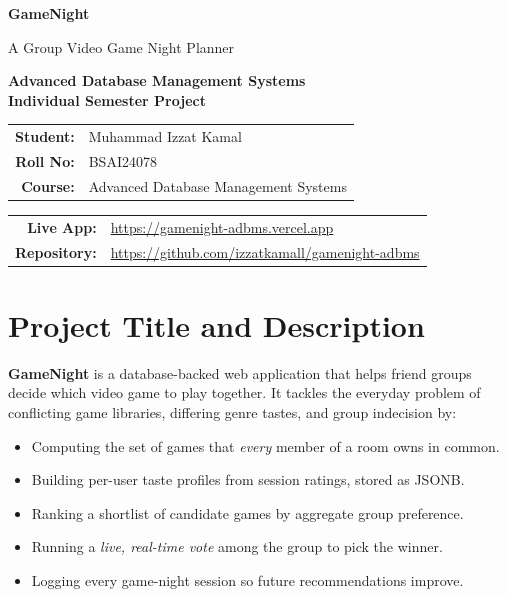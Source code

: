 \documentclass[11pt,a4paper]{article}
\begin{document}
\begin{titlepage}
\centering
\vspace*{2cm}
{\Huge\bfseries\color{accent} GameNight\par}
\vspace{0.4cm}
{\Large A Group Video Game Night Planner\par}
\vspace{1.5cm}
{\large\bfseries Advanced Database Management Systems\\Individual Semester Project\par}
\vspace{2cm}
\begin{tabular}{rl}
\textbf{Student:} & Muhammad Izzat Kamal \\[4pt]
\textbf{Roll No:} & BSAI24078 \\[4pt]
\textbf{Course:} & Advanced Database Management Systems \\
\end{tabular}
\vfill
\begin{tabular}{rl}
\textbf{Live App:} & \url{https://gamenight-adbms.vercel.app} \\[4pt]
\textbf{Repository:} & \url{https://github.com/izzatkamall/gamenight-adbms} \\
\end{tabular}
\vspace{1cm}
\end{titlepage}

\tableofcontents
\newpage

\section{Project Title and Description}
\textbf{GameNight} is a database-backed web application that helps friend groups
decide which video game to play together. It tackles the everyday problem of
conflicting game libraries, differing genre tastes, and group indecision by:

\begin{itemize}[leftmargin=1.4em]
  \item Computing the set of games that \emph{every} member of a room owns in common.
  \item Building per-user taste profiles from session ratings, stored as JSONB.
  \item Ranking a shortlist of candidate games by aggregate group preference.
  \item Running a \emph{live, real-time vote} among the group to pick the winner.
  \item Logging every game-night session so future recommendations improve.
\end{itemize}
\end{document}
